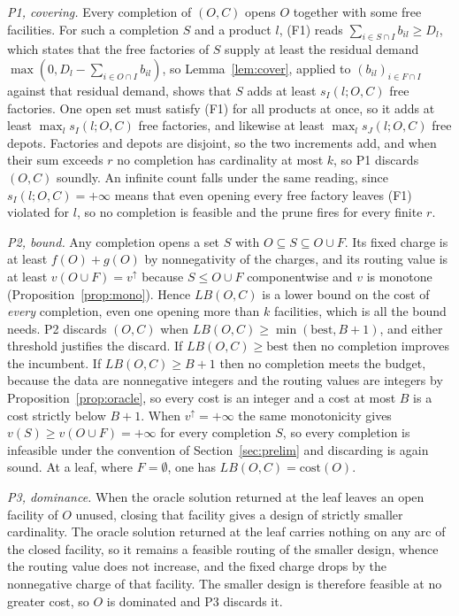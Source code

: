 \emph{P1, covering.} Every completion of $(O,C)$ opens $O$ together with
some free facilities. For such a completion $S$ and a product $l$, (F1)
reads $\sum_{i\in S\cap I}b_{il}\ge D_l$, which states that the free
factories of $S$ supply at least the residual demand
$\max(0,D_l-\sum_{i\in O\cap I}b_{il})$, so Lemma~\ref{lem:cover},
applied to $(b_{il})_{i\in F\cap I}$ against that residual demand, shows
that $S$ adds at least $s_I(l;O,C)$ free factories. One open set must
satisfy (F1) for all
products at once, so it adds at least $\max_l s_I(l;O,C)$ free factories,
and likewise at least $\max_l s_J(l;O,C)$ free depots. Factories and depots
are disjoint, so the two increments add, and when their sum exceeds $r$ no
completion has cardinality at most $k$, so P1 discards $(O,C)$ soundly.
An infinite count falls under the same reading, since
$s_I(l;O,C)=+\infty$ means that even opening every free factory leaves
(F1) violated for $l$, so no completion is feasible and the prune fires
for every finite $r$.

\emph{P2, bound.} Any completion opens a set $S$ with $O\subseteq
S\subseteq O\cup F$. Its fixed charge is at least $f(O)+g(O)$ by
nonnegativity of the charges, and its routing
value is at least $v(O\cup F)=v^{\uparrow}$ because $S\le O\cup F$
componentwise and $v$ is monotone (Proposition~\ref{prop:mono}). Hence
$LB(O,C)$ is a lower bound on the cost of \emph{every} completion, even one
opening more than $k$ facilities, which is all the bound needs. P2 discards
$(O,C)$ when $LB(O,C)\ge\min(\mathrm{best},B+1)$, and either threshold
justifies the discard. If $LB(O,C)\ge\mathrm{best}$ then no completion
improves the incumbent. If $LB(O,C)\ge B+1$ then no completion meets the
budget, because the data are nonnegative integers and the routing values
are integers by Proposition~\ref{prop:oracle}, so every cost is an
integer and a cost at most $B$ is a cost strictly below $B+1$. When
$v^{\uparrow}=+\infty$ the same monotonicity gives
$v(S)\ge v(O\cup F)=+\infty$ for every completion $S$, so every
completion is infeasible under the convention of
Section~\ref{sec:prelim} and discarding is again sound. At a
leaf, where $F=\emptyset$, one has $LB(O,C)=\mathrm{cost}(O)$.

\emph{P3, dominance.} When the oracle solution returned at the leaf
leaves an open facility of $O$ unused, closing that facility gives a
design of strictly smaller cardinality. The oracle solution returned at
the leaf carries nothing on any arc of the
closed facility, so it remains a feasible routing of the smaller design,
whence the routing value does not increase, and the fixed charge drops
by the nonnegative charge of that facility. The smaller design is
therefore feasible at no greater cost, so $O$ is dominated and P3
discards it.

